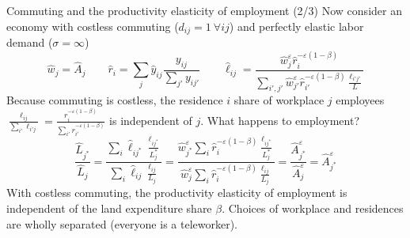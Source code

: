 \documentclass[11pt,notes=hide,aspectratio=169]{beamer}
\begin{document}
\begin{frame}{Commuting and the productivity elasticity of employment (2/3)}
Now consider an economy with costless commuting ($d_{ij} = 1 \ \forall ij$) and perfectly elastic labor demand ($\sigma = \infty$)
\begin{equation*}
\hat{w}_{j}
=
\hat{A}_j
\qquad
\hat{r}_{i}
=
\sum_{j}\hat{y}_{ij}\frac{y_{ij}}{\sum_{j'}y_{ij'}}
\qquad
\hat{\ell}_{ij} 
=
\frac{\hat{w}_{j}^{\varepsilon}\hat{r}_{i}^{-\varepsilon(1-\beta)}}{\sum_{i',j'} \hat{w}_{j'}^{\varepsilon}\hat{r}_{i'}^{-\varepsilon(1-\beta)} \frac{\ell_{i'j'}}{L}}
\end{equation*}
Because commuting is costless,
the residence $i$ share of workplace $j$ employees
$\frac{\ell_{ij}}{\sum_{i'} \ell_{i'j}} = \frac{r_{i}^{-\varepsilon(1-\beta)}}{\sum_{i'} r_{i'}^{-\varepsilon(1-\beta)}}$
is independent of $j$.
What happens to employment?
$$
\frac{\hat{L}_{j^{*}}}{\hat{L}_{j}}
=
\frac{\sum_{i}\hat{\ell}_{ij^{*}} \frac{\ell_{ij^{*}}}{L_j^{*}}}{\sum_{i}\hat{\ell}_{ij} \frac{\ell_{ij}}{L_j}}
=
\frac{\hat{w}_{j^{*}}^{\varepsilon} \sum_{i} \hat{r}_{i}^{-\varepsilon(1-\beta)} \frac{\ell_{ij^{*}}}{L_j^{*}}}{\hat{w}_{j}^{\varepsilon} \sum_{i} \hat{r}_{i}^{-\varepsilon(1-\beta)} \frac{\ell_{ij}}{L_j}}
=
\frac{\hat{A}_{j^{*}}^{\varepsilon}}{\hat{A}_{j}^{\varepsilon}}
=
\hat{A}_{j^{*}}^{\varepsilon}
$$
With costless commuting, the productivity elasticity of employment is independent of the land expenditure share $\beta$.
Choices of workplace and residences are wholly separated (everyone is a teleworker).
\end{frame}
\end{document}
